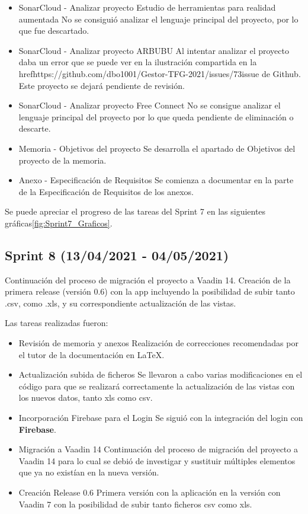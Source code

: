 \begin{itemize}
	\item SonarCloud - Analizar proyecto Estudio de herramientas para realidad aumentada
		No se consiguió analizar el lenguaje principal del proyecto, por lo que fue descartado.
	\item SonarCloud - Analizar proyecto ARBUBU
		Al intentar analizar el proyecto daba un error que se puede ver en la ilustración compartida en la href{https://github.com/dbo1001/Gestor-TFG-2021/issues/73}{issue} de Github. Este proyecto se dejará pendiente de revisión.
	\item SonarCloud - Analizar proyecto Free Connect
		No se consigue analizar el lenguaje principal del proyecto por lo que queda pendiente de eliminación o descarte.
	\item Memoria - Objetivos del proyecto 
		Se desarrolla el apartado de Objetivos del proyecto de la memoria.
	\item Anexo - Especificación de Requisitos
		Se comienza a documentar en la parte de la Especificación de Requisitos de los anexos.
\end{itemize}

Se puede apreciar el progreso de las tareas del Sprint 7 en las siguientes gráficas\ref{fig:Sprint7_Graficos}.



\subsection{Sprint 8 (13/04/2021 - 04/05/2021)}
Continuación del proceso de migración el proyecto a Vaadin 14. Creación de la primera release (versión 0.6) con la app incluyendo la posibilidad de subir tanto .csv, como .xls, y su correspondiente actualización de las vistas.

Las tareas realizadas fueron:
\begin{itemize}
	\tightlist
	\item Revisión de memoria y anexos
		Realización de correcciones recomendadas por el tutor de la documentación en LaTeX.
	\item Actualización subida de ficheros
		Se llevaron a cabo varias modificaciones en el código para que se realizará correctamente la actualización de las vistas con los nuevos datos, tanto xls como csv.
	\item Incorporación Firebase para el Login 
		Se siguió con la integración del login con \textbf{Firebase}.
	\item Migración a Vaadin 14
		Continuación del proceso de migración del proyecto a Vaadin 14 para lo cual se debió de investigar y sustituir múltiples elementos que ya no existían en la nueva versión.
	\item Creación Release 0.6 
		Primera versión con la aplicación en la versión con Vaadin 7 con la posibilidad de subir tanto ficheros csv como xls. 
\end{itemize}

